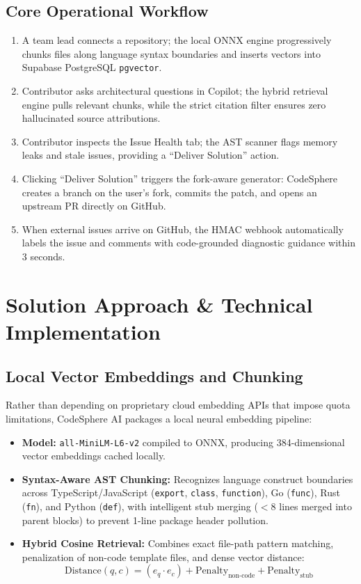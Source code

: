 \documentclass[11pt,a4paper]{article}
\begin{document}
\subsection{Core Operational Workflow}
\begin{enumerate}
    \item A team lead connects a repository; the local ONNX engine progressively chunks files along language syntax boundaries and inserts vectors into Supabase PostgreSQL \texttt{pgvector}.
    \item Contributor asks architectural questions in Copilot; the hybrid retrieval engine pulls relevant chunks, while the strict citation filter ensures zero hallucinated source attributions.
    \item Contributor inspects the Issue Health tab; the AST scanner flags memory leaks and stale issues, providing a ``Deliver Solution'' action.
    \item Clicking ``Deliver Solution'' triggers the fork-aware generator: CodeSphere creates a branch on the user's fork, commits the patch, and opens an upstream PR directly on GitHub.
    \item When external issues arrive on GitHub, the HMAC webhook automatically labels the issue and comments with code-grounded diagnostic guidance within 3 seconds.
\end{enumerate}

\section{Solution Approach \& Technical Implementation}

\subsection{Local Vector Embeddings and Chunking}
Rather than depending on proprietary cloud embedding APIs that impose quota limitations, CodeSphere AI packages a local neural embedding pipeline:
\begin{itemize}
    \item \textbf{Model:} \texttt{all-MiniLM-L6-v2} compiled to ONNX, producing 384-dimensional vector embeddings cached locally.
    \item \textbf{Syntax-Aware AST Chunking:} Recognizes language construct boundaries across TypeScript/JavaScript (\texttt{export}, \texttt{class}, \texttt{function}), Go (\texttt{func}), Rust (\texttt{fn}), and Python (\texttt{def}), with intelligent stub merging ($<8$ lines merged into parent blocks) to prevent 1-line package header pollution.
    \item \textbf{Hybrid Cosine Retrieval:} Combines exact file-path pattern matching, penalization of non-code template files, and dense vector distance:
    \[
    \text{Distance}(q, c) = (e_q \cdot e_c) + \text{Penalty}_{\text{non-code}} + \text{Penalty}_{\text{stub}}
    \]
\end{itemize}
\end{document}
